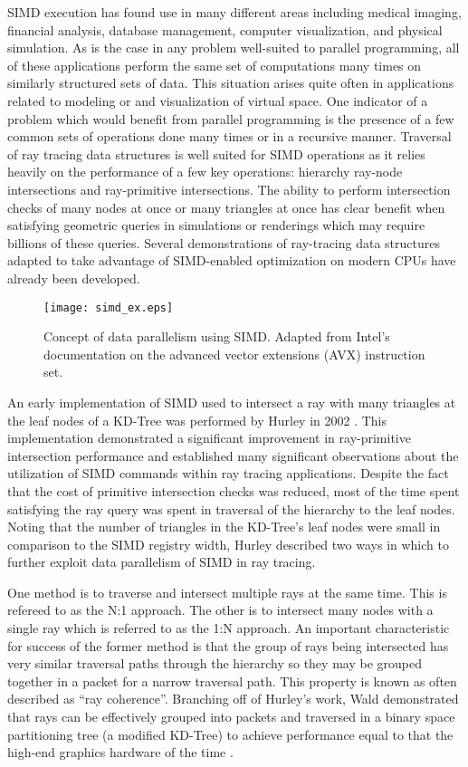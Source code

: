 SIMD execution has found use in many different areas including medical imaging,
financial analysis, database management, computer visualization, and physical
simulation. As is the case in any problem well-suited to parallel programming,
all of these applications perform the same set of computations many times on
similarly structured sets of data. This situation arises quite often in applications
related to modeling or and visualization of virtual space. One indicator of a
problem which would benefit from parallel programming is the presence of a few
common sets of operations done many times or in a recursive manner. Traversal of
ray tracing data structures is well suited for SIMD operations as it relies
heavily on the performance of a few key operations: hierarchy ray-node
intersections and ray-primitive intersections. The ability to perform intersection
checks of many nodes at once or many triangles at once has clear benefit when
satisfying geometric queries in simulations or renderings which may require
billions of these queries. Several demonstrations of ray-tracing data structures
adapted to take advantage of SIMD-enabled optimization on modern CPUs have
already been developed.

\begin{figure}
  \centering
  \texttt{[image: simd\_ex.eps]}
  \caption{Concept of data parallelism using SIMD. Adapted from Intel's
    documentation on the advanced vector extensions (AVX) instruction
    set. \cite{Intel_AVX}}
  \label{fig:simd}
\end{figure}

An early implementation of SIMD used to intersect a ray with many triangles at
the leaf nodes of a KD-Tree was performed by Hurley in 2002
\cite{Hurley_2002}. This implementation demonstrated a significant improvement in
ray-primitive intersection performance and established many significant
observations about the utilization of SIMD commands within ray tracing
applications. Despite the fact that the cost of primitive intersection checks
was reduced, most of the time spent satisfying the ray query was spent in
traversal of the hierarchy to the leaf nodes. Noting that the number of
triangles in the KD-Tree's leaf nodes were small in comparison to the SIMD
registry width, Hurley described two ways in which to further exploit data
parallelism of SIMD in ray tracing.

One method is to traverse and intersect multiple rays at the same time. This is
refereed to as the N:1 approach. The other is to intersect many nodes with a
single ray which is referred to as the 1:N approach. An important characteristic
for success of the former method is that the group of rays being intersected has
very similar traversal paths through the hierarchy so they may be grouped
together in a packet for a narrow traversal path. This property is known as
often described as ``ray coherence''. Branching off of Hurley's work, Wald
demonstrated that rays can be effectively grouped into packets and traversed in
a binary space partitioning tree (a modified KD-Tree) to achieve performance
equal to that the high-end graphics hardware of the time \cite{Wald_2001}.

